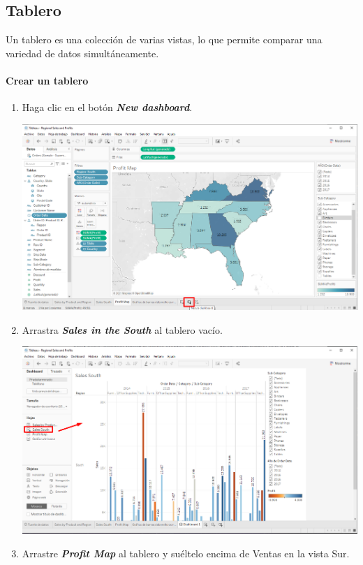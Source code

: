 \documentclass[12pt,letterpaper]{article}
\begin{document}
    \subsection{Tablero}
    Un tablero es una colección de varias vistas, lo que permite comparar una variedad de datos simultáneamente.
    \paragraph{\Large Crear un tablero}
    \begin{enumerate}
        \item Haga clic en el botón \textit{\textbf{New dashboard}}.
        \begin{center}
            \includegraphics[width=15cm]{./img/img67.png}
        \end{center}
        \item Arrastra \textit{\textbf{Sales in the South}} al tablero vacío.
        \begin{center}
            \includegraphics[width=15cm]{./img/img68.png}
        \end{center}
        \item Arrastre \textit{\textbf{Profit Map}} al tablero y suéltelo encima de Ventas en la vista Sur.

\end{enumerate}
\end{document}
